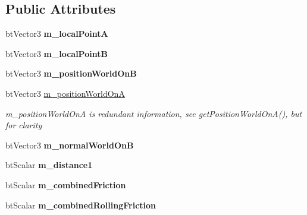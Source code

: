 \subsection*{Public Attributes}
\begin{DoxyCompactItemize}
\item 
\hypertarget{classbt_manifold_point_a58a8028c5de712ff0224cfde8c9e8e44}{bt\+Vector3 {\bfseries m\+\_\+local\+Point\+A}}\label{classbt_manifold_point_a58a8028c5de712ff0224cfde8c9e8e44}

\item 
\hypertarget{classbt_manifold_point_a6df421e6b6345cacee6b1bdd6307fe6b}{bt\+Vector3 {\bfseries m\+\_\+local\+Point\+B}}\label{classbt_manifold_point_a6df421e6b6345cacee6b1bdd6307fe6b}

\item 
\hypertarget{classbt_manifold_point_ae64702f66baa6539b56dd1f7d2f163e0}{bt\+Vector3 {\bfseries m\+\_\+position\+World\+On\+B}}\label{classbt_manifold_point_ae64702f66baa6539b56dd1f7d2f163e0}

\item 
\hypertarget{classbt_manifold_point_a5fd89785a2e081dd658b15af8bedf04b}{bt\+Vector3 \hyperlink{classbt_manifold_point_a5fd89785a2e081dd658b15af8bedf04b}{m\+\_\+position\+World\+On\+A}}\label{classbt_manifold_point_a5fd89785a2e081dd658b15af8bedf04b}

\begin{DoxyCompactList}\small\item\em m\+\_\+position\+World\+On\+A is redundant information, see get\+Position\+World\+On\+A(), but for clarity \end{DoxyCompactList}\item 
\hypertarget{classbt_manifold_point_ac821b226c09cd4f50009645fa932161e}{bt\+Vector3 {\bfseries m\+\_\+normal\+World\+On\+B}}\label{classbt_manifold_point_ac821b226c09cd4f50009645fa932161e}

\item 
\hypertarget{classbt_manifold_point_a8a42d00697733931ef82220feca0f401}{bt\+Scalar {\bfseries m\+\_\+distance1}}\label{classbt_manifold_point_a8a42d00697733931ef82220feca0f401}

\item 
\hypertarget{classbt_manifold_point_ad4ac2c484c62af1142d2aea1a3e67777}{bt\+Scalar {\bfseries m\+\_\+combined\+Friction}}\label{classbt_manifold_point_ad4ac2c484c62af1142d2aea1a3e67777}

\item 
\hypertarget{classbt_manifold_point_a3e25a81eaabb31cb5caf1510da3b7946}{bt\+Scalar {\bfseries m\+\_\+combined\+Rolling\+Friction}}\label{classbt_manifold_point_a3e25a81eaabb31cb5caf1510da3b7946}


\end{DoxyCompactItemize}
